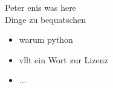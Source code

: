 Peter enis was here\\

Dinge zu bequatschen
\begin{itemize}
  \item warum python
  \item vllt ein Wort zur Lizenz
  \item ...
\end{itemize}
